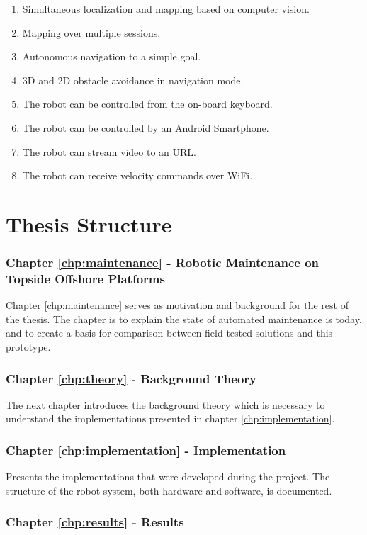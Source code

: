 \begin{enumerate}
\item Simultaneous localization and mapping based on computer vision.
\item Mapping over multiple sessions.
\item Autonomous navigation to a simple goal.
\item 3D and 2D obstacle avoidance in navigation mode.
\item The robot can be controlled from the on-board keyboard.
\item The robot can be controlled by an Android Smartphone.
\item The robot can stream video to an URL.
\item The robot can receive velocity commands over WiFi.
\end{enumerate} 



\section{Thesis Structure}

\subsubsection{Chapter \ref{chp:maintenance} - Robotic Maintenance on Topside Offshore Platforms} 

Chapter \ref{chp:maintenance} serves as motivation and background for the rest of the thesis. The chapter is to explain the state of automated maintenance is today, and to create a basis for comparison between field tested solutions and this prototype.

\subsubsection{Chapter \ref{chp:theory} - Background Theory}
The next chapter introduces the background theory which is necessary to understand the implementations presented in chapter \ref{chp:implementation}. 

\subsubsection{Chapter \ref{chp:implementation} - Implementation}
Presents the implementations that were developed during the project. The structure of the robot system, both hardware and software, is documented.

\subsubsection{Chapter \ref{chp:results} - Results}

